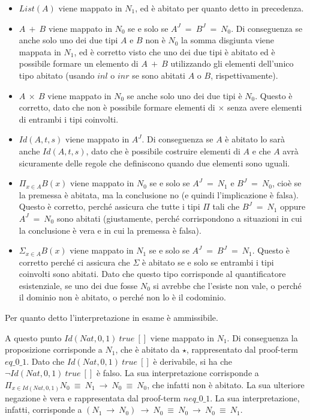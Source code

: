 \begin{itemize}
	\item $List(A)$ viene mappato in $N_1$, ed è abitato per quanto detto in precedenza.
	\item $A~+~B$ viene mappato in $N_0$ se e solo se $A^J~=~B^J~=~N_0$. Di conseguenza se anche solo uno dei due tipi $A$ e $B$ non è $N_0$ la somma disgiunta viene mappata in $N_1$, ed è corretto visto che uno dei due tipi è abitato ed è possibile formare un elemento di $A~+~B$ utilizzando gli elementi dell'unico tipo abitato (usando $inl$ o $inr$ se sono abitati $A$ o $B$, rispettivamente).
	\item $A~\times~B$ viene mappato in $N_0$ se anche solo uno dei due tipi è $N_0$. Questo è corretto, dato che non è possibile formare elementi di $\times$ senza avere elementi di entrambi i tipi coinvolti.
	\item $Id(A,t,s)$ viene mappato in $A^J$. Di conseguenza se $A$ è abitato lo sarà anche $Id(A,t,s)$, dato che è possibile costruire elementi di $A$ e che $A$ avrà sicuramente delle regole che definiscono quando due elementi sono uguali.
	\item $\Pi_{x\in A}B(x)$ viene mappato in $N_0$ se e solo se $A^J~=~N_1$ e $B^J~=~N_0$, cioè se la premessa è abitata, ma la conclusione no (e quindi l'implicazione è falsa). Questo è corretto, perché assicura che tutte i tipi $\Pi$ tali che $B^J~=~N_1$ oppure $A^J~=~N_0$ sono abitati (giustamente, perché corrispondono a situazioni in cui la conclusione è vera e in cui la premessa è falsa).
	\item $\Sigma_{x\in A}B(x)$ viene mappato in $N_1$ se e solo se $A^J~=~B^J~=~N_1$. Questo è corretto perché ci assicura che $\Sigma$ è abitato se e solo se entrambi i tipi coinvolti sono abitati. Dato che questo tipo corrisponde al quantificatore esistenziale, se uno dei due fosse $N_0$ si avrebbe che l'esiste non vale, o perché il dominio non è abitato, o perché non lo è il codominio.
\end{itemize}
Per quanto detto l'interpretazione in esame è ammissibile. 

A questo punto $Id(Nat,0,1)~true~[]$ viene mappato in $N_1$. Di conseguenza la proposizione corrisponde a $N_1$, che è abitato da $\star$, rappresentato dal proof-term $eq\_0\_1$. Dato che $Id(Nat,0,1)~true~[]$ è derivabile, si ha che $\neg Id(Nat,0,1)~true~[]$ è falso. La sua interpretazione corrisponde a $\Pi_{x\in Id(Nat,0,1)}N_0~\equiv~N_1~\to~N_0~\equiv~N_0$, che infatti non è abitato. La sua ulteriore negazione è vera e rappresentata dal proof-term $neq\_0\_1$. La sua interpretazione, infatti, corrisponde a $(N_1~\to~N_0)~\to~N_0~\equiv~N_0~\to~N_0~\equiv~N_1$.


